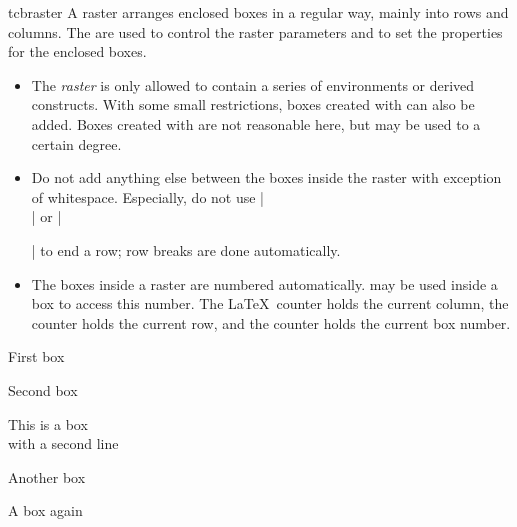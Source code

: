 \begin{docEnvironment}[doc new and updated={2014-11-10}{2017-02-01}]{tcbraster}{}
A raster arranges enclosed boxes in a regular way, mainly into rows and
columns. The  are used to control the raster
parameters and to set the properties for the enclosed boxes.
\begin{itemize}
\item The \emph{raster} is only allowed to contain a series of
   environments or derived constructs.
  With some small restrictions, boxes created with  can also be added.
  Boxes created with  are not reasonable here, but may be
  used to a certain degree.
\item Do not add anything else between the boxes inside the raster with
  exception of white\-space. Especially, do not use |\\| or |\par| to end
  a row; row breaks are done automatically.
\item The boxes inside a raster are numbered automatically.
   may be used inside a box to access
  this number.
  The \LaTeX\ counter  holds the current column,
  the counter  holds the current row,
  and the counter  holds the current box number.
\end{itemize}

\enlargethispage*{1cm}

\begin{dispExample}
\begin{tcbraster}[raster columns=3, raster equal height,
  size=small,colframe=red!50!black,colback=red!10!white,colbacktitle=red!50!white,
  title={Box \# \thetcbrasternum}]
  \begin{tcolorbox}First box\end{tcolorbox}
  \begin{tcolorbox}Second box\end{tcolorbox}
  \begin{tcolorbox}This is a box\\with a second line\end{tcolorbox}
  \begin{tcolorbox}Another box\end{tcolorbox}
  \begin{tcolorbox}A box again\end{tcolorbox}
\end{tcbraster}
\end{dispExample}


\end{docEnvironment}

